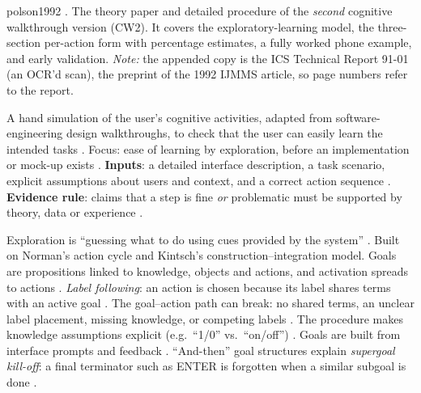 \begin{papercard}{polson1992}
 . The theory paper and detailed procedure of the \emph{second} cognitive walkthrough version (CW2). It covers the exploratory-learning model, the three-section per-action form with percentage estimates, a fully worked phone example, and early validation. \emph{Note:} the appended copy is the ICS Technical Report 91-01 (an OCR'd scan), the preprint of the 1992 IJMMS article, so page numbers refer to the report.

 A hand simulation of the user's cognitive activities, adapted from software-engineering design walkthroughs, to check that the user can easily learn the intended tasks . Focus: ease of learning by exploration, before an implementation or mock-up exists . \textbf{Inputs}: a detailed interface description, a task scenario, explicit assumptions about users and context, and a correct action sequence . \textbf{Evidence rule}: claims that a step is fine \emph{or} problematic must be supported by theory, data or experience .

 Exploration is ``guessing what to do using cues provided by the system'' . Built on Norman's action cycle and Kintsch's construction--integration model. Goals are propositions linked to knowledge, objects and actions, and activation spreads to actions . \emph{Label following}: an action is chosen because its label shares terms with an active goal . The goal--action path can break: no shared terms, an unclear label placement, missing knowledge, or competing labels . The procedure makes knowledge assumptions explicit (e.g.\ ``1/0'' vs.\ ``on/off'') . Goals are built from interface prompts and feedback . ``And-then'' goal structures explain \emph{supergoal kill-off}: a final terminator such as ENTER is forgotten when a similar subgoal is done .


\end{papercard}
